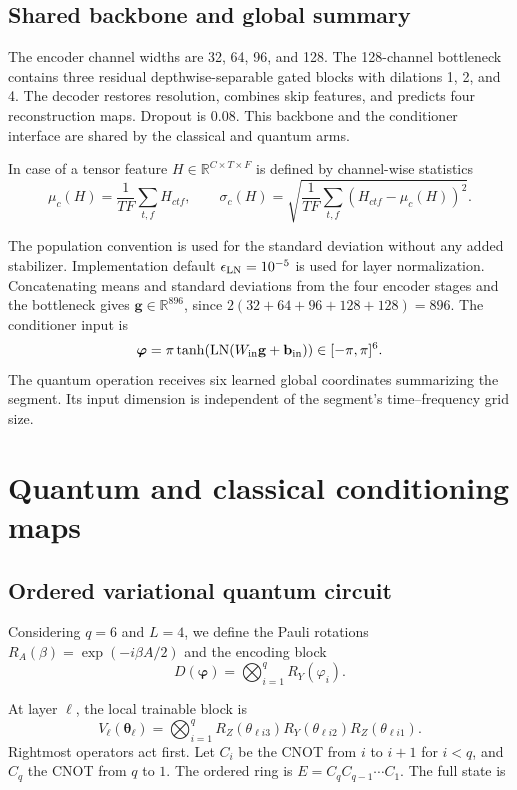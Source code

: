 \documentclass[10pt,a4paper]{article}
\newcommand{\R}{\mathbb{R}}
\begin{document}
\subsection{Shared backbone and global summary}
The encoder channel widths are 32, 64, 96, and 128. The 128-channel bottleneck contains three residual depthwise-separable gated blocks with dilations 1, 2, and 4. The decoder restores resolution, combines skip features, and predicts four reconstruction maps. Dropout is 0.08. This backbone and the conditioner interface are shared by the classical and quantum arms.

In case of a tensor feature $H\in\R^{C\times T\times F}$ is defined by channel-wise statistics
\begin{equation}
\mu_c(H)=\frac1{TF}\sum_{t,f}H_{ctf},\qquad
\sigma_c(H)=\sqrt{\frac1{TF}\sum_{t,f}(H_{ctf}-\mu_c(H))^2}.
\end{equation}

The population convention is used for the standard deviation without any added stabilizer. Implementation default $\epsilon_{\rm LN}=10^{-5}$ is used for layer normalization. Concatenating means and standard deviations from the four encoder stages and the bottleneck gives $\mathbf g\in\R^{896}$, since
$2(32+64+96+128+128)=896$. The conditioner input is
\begin{equation}\label{eq:angles}
\boldsymbol\varphi=\pi\tanh\!\left(\operatorname{LN}(W_{\rm in}\mathbf g+\mathbf b_{\rm in})\right)\in[-\pi,\pi]^6.
\end{equation}
The quantum operation receives six learned global coordinates summarizing the segment. Its input dimension is independent of the segment's time--frequency grid size.

\section{Quantum and classical conditioning maps}
\subsection{Ordered variational quantum circuit}
Considering $q=6$ and $L=4$,  we define the Pauli rotations $R_A(\beta)=\exp(-i\beta A/2)$ and the encoding block
\begin{equation}
D(\boldsymbol\varphi)=\bigotimes_{i=1}^{q}R_Y(\varphi_i).
\end{equation}

At layer $\ell$, the local trainable block is
\begin{equation}
V_\ell(\boldsymbol\theta_\ell)=\bigotimes_{i=1}^{q}
R_Z(\theta_{\ell i3})R_Y(\theta_{\ell i2})R_Z(\theta_{\ell i1}).
\end{equation}
Rightmost operators act first. Let $C_i$ be the CNOT from $i$ to $i+1$ for $i<q$, and $C_q$ the CNOT from $q$ to $1$. The ordered ring is $E=C_q C_{q-1}\cdots C_1$. The full state is
\end{document}
